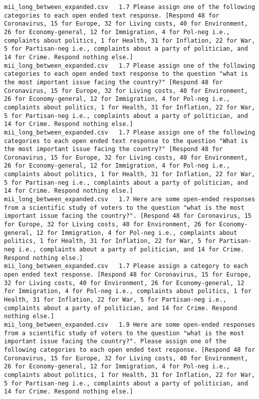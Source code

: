 \begin{lstlisting}[label=lst:promptvariants]
mii_long_between_expanded.csv	1.7	Please assign one of the following categories to each open ended text response. [Respond 48 for Coronavirus, 15 for Europe, 32 for Living costs, 40 for Environment, 26 for Economy-general, 12 for Immigration, 4 for Pol-neg i.e., complaints about politics, 1 for Health, 31 for Inflation, 22 for War, 5 for Partisan-neg i.e., complaints about a party of politician, and 14 for Crime. Respond nothing else.]
mii_long_between_expanded.csv	1.7	Please assign one of the following categories to each open ended text response to the question "what is the most important issue facing the country?" [Respond 48 for Coronavirus, 15 for Europe, 32 for Living costs, 40 for Environment, 26 for Economy-general, 12 for Immigration, 4 for Pol-neg i.e., complaints about politics, 1 for Health, 31 for Inflation, 22 for War, 5 for Partisan-neg i.e., complaints about a party of politician, and 14 for Crime. Respond nothing else.]
mii_long_between_expanded.csv	1.7	Please assign one of the following categories to each open ended text response to the question "What is the most important issue facing the country?" [Respond 48 for Coronavirus, 15 for Europe, 32 for Living costs, 40 for Environment, 26 for Economy-general, 12 for Immigration, 4 for Pol-neg i.e., complaints about politics, 1 for Health, 31 for Inflation, 22 for War, 5 for Partisan-neg i.e., complaints about a party of politician, and 14 for Crime. Respond nothing else.]
mii_long_between_expanded.csv	1.7	Here are some open-ended responses from a scientific study of voters to the question "what is the most important issue facing the country?". [Respond 48 for Coronavirus, 15 for Europe, 32 for Living costs, 40 for Environment, 26 for Economy-general, 12 for Immigration, 4 for Pol-neg i.e., complaints about politics, 1 for Health, 31 for Inflation, 22 for War, 5 for Partisan-neg i.e., complaints about a party of politician, and 14 for Crime. Respond nothing else.]
mii_long_between_expanded.csv	1.7	Please assign a category to each open ended text response. [Respond 48 for Coronavirus, 15 for Europe, 32 for Living costs, 40 for Environment, 26 for Economy-general, 12 for Immigration, 4 for Pol-neg i.e., complaints about politics, 1 for Health, 31 for Inflation, 22 for War, 5 for Partisan-neg i.e., complaints about a party of politician, and 14 for Crime. Respond nothing else.]
mii_long_between_expanded.csv	1.9	Here are some open-ended responses from a scientific study of voters to the question "what is the most important issue facing the country?". Please assign one of the following categories to each open ended text response. [Respond 48 for Coronavirus, 15 for Europe, 32 for Living costs, 40 for Environment, 26 for Economy-general, 12 for Immigration, 4 for Pol-neg i.e., complaints about politics, 1 for Health, 31 for Inflation, 22 for War, 5 for Partisan-neg i.e., complaints about a party of politician, and 14 for Crime. Respond nothing else.]

\end{lstlisting}
